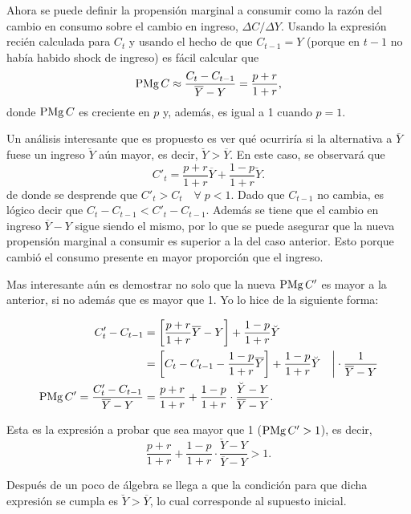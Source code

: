 \documentclass[DeGregorioResumen]{subfiles}
\begin{document}
Ahora se puede definir la propensión marginal a consumir como la razón del cambio en consumo sobre el cambio en ingreso, $	\Delta C/\Delta Y$. Usando la expresión recién calculada para $C_t$ y usando el hecho de que $C_{t-1}=Y$ (porque en $t-1$ no había habido shock de ingreso) es fácil calcular que
\begin{equation}
\operatorname{PMg} C \approx \frac{C_t-C_{t-1}}{\overline{Y}-Y} = \frac{p+r}{1+r},
\end{equation}
donde $\operatorname{PMg} C$ es creciente en $p$ y, además, es igual a 1 cuando $p=1$.

Un análisis interesante que es propuesto es ver qué ocurriría si la alternativa a $\overline{Y}$ fuese un ingreso $\breve{Y}$ aún mayor, es decir, $\breve{Y}>\overline{Y}$. En este caso, se observará que
\begin{equation*}
C'_t=\frac{p+r}{1+r}\overline{Y}+\frac{1-p}{1+r}\breve{Y}.
\end{equation*}
de donde se desprende que $C'_{t}>C_{t} \quad \forall \; p<1$. Dado que  $C_{t-1}$ no cambia, es lógico decir que $C_t-C_{t-1}<C'_t-C_{t-1}$. Además se tiene que el cambio en ingreso $\overline{Y}-Y$ sigue siendo el mismo, por lo que se puede asegurar que la nueva propensión marginal a consumir es superior a la del caso anterior. Esto porque cambió el consumo presente en mayor proporción que el ingreso.

Mas interesante aún es demostrar no solo que la nueva $\operatorname{PMg} C'$ es mayor a la anterior, si no además que es mayor que 1. Yo lo hice de la siguiente forma:

\begin{align*}
C'_t-C_{t-1} &= \left[\frac{p+r}{1+r}\overline{Y}-Y\right]+\frac{1-p}{1+r}\breve{Y} \\
 &= \left[C_t-C_{t-1}-\frac{1-p}{1+r}\overline{Y}\right]+\frac{1-p}{1+r}\breve{Y} \quad \bigg|\cdot \frac{1}{\overline{Y}-Y} \\
\operatorname{PMg} C'=\frac{C'_t-C_{t-1}}{\overline{Y}-Y}&= \frac{p+r}{1+r} + \frac{1-p}{1+r}\cdot\frac{\breve{Y}-Y}{\overline{Y}-Y}.
\end{align*}

Esta es la expresión a probar que sea mayor que 1 ($\operatorname{PMg} C'>1$), es decir,
\begin{equation*}
\frac{p+r}{1+r} + \frac{1-p}{1+r}\cdot\frac{\breve{Y}-Y}{\overline{Y}-Y} > 1.
\end{equation*}

Después de un poco de álgebra se llega a que la condición para que dicha expresión se cumpla es $\breve{Y}>\overline{Y}$, lo cual corresponde al supuesto inicial.
\end{document}
